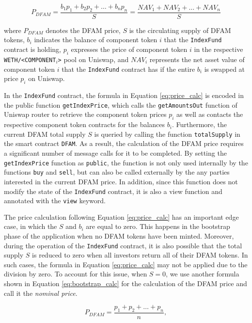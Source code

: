 \begin{equation} \label{eq:price_calc}
P_{DFAM} = \frac{b_1 p_1 + b_2 p_2 + \ldots + b_n p_n}{S} = \frac{NAV_1 + NAV_2 + \ldots + NAV_n}{S}
\end{equation}

where $P_{DFAM}$ denotes the DFAM price, $S$ is the circulating supply of DFAM tokens, $b_i$ indicates the balance of component token $i$ that the \texttt{IndexFund} contract is holding, $p_i$ expresses the price of component token $i$ in the respective \texttt{WETH/<COMPONENT$_i$>} pool on Uniswap, and $NAV_i$ represents the net asset value of component token $i$ that the \texttt{IndexFund} contract has if the entire $b_i$ is swapped at price $p_i$ on Uniswap.

In the \texttt{IndexFund} contract, the formula in Equation \ref{eq:price_calc} is encoded in the public function \texttt{getIndexPrice}, which calls the \texttt{getAmountsOut} function of Uniswap router to retrieve the component token prices $p_i$ as well as contacts the respective component token contracts for the balances $b_i$. Furthermore, the current DFAM total supply $S$ is queried by calling the function \texttt{totalSupply} in the smart contract \texttt{DFAM}. As a result, the calculation of the DFAM price requires a significant number of message calls for it to be completed. By setting the \texttt{getIndexPrice} function as \texttt{public}, the function is not only used internally by the functions \texttt{buy} and \texttt{sell}, but can also be called externally by the any parties interested in the current DFAM price. In addition, since this function does not modify the state of the \texttt{IndexFund} contract, it is also a view function and annotated with the \texttt{view} keyword.

The price calculation following Equation \ref{eq:price_calc} has an important edge case, in which the $S$ and $b_i$ are equal to zero. This happens in the bootstrap phase of the application when no DFAM tokens have been minted. Moreover, during the operation of the \texttt{IndexFund} contract, it is also possible that the total supply $S$ is reduced to zero when all investors return all of their DFAM tokens. In such cases, the formula in Equation \ref{eq:price_calc} may not be applied due to the division by zero. To account for this issue, when $S = 0$, we use another formula shown in Equation \ref{eq:bootstrap_calc} for the calculation of the DFAM price and call it the \textit{nominal price}.

\begin{equation} \label{eq:bootstrap_calc}
P_{DFAM} = \frac{p_1 + p_2 + \ldots + p_n}{n},
\end{equation}

